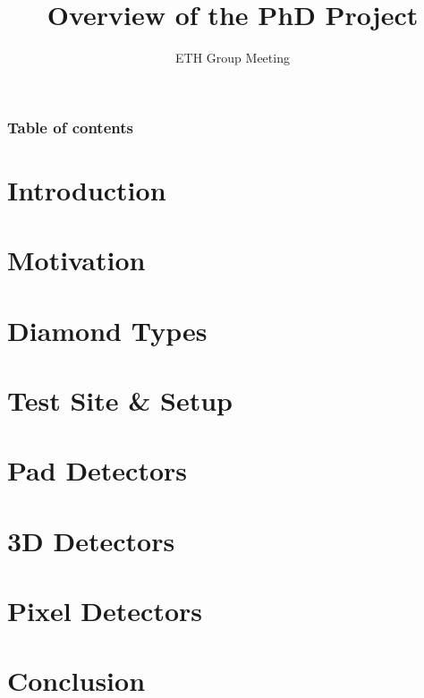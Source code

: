 \documentclass[9pt, xcolor=dvipsnames]{beamer}
\title[short]{Overview of the PhD Project}
\subtitle{ETH Group Meeting}
\begin{document}


\begin{frame}%
	\frametitle{Table of contents}
	\tableofcontents[hideallsubsections]   %
\end{frame}

\section{Introduction}


\section{Motivation}


\section{Diamond Types}


\section{Test Site \& Setup}


\section{Pad Detectors}


\section{3D Detectors}


\section{Pixel Detectors}


\section{Conclusion}


\end{document}
